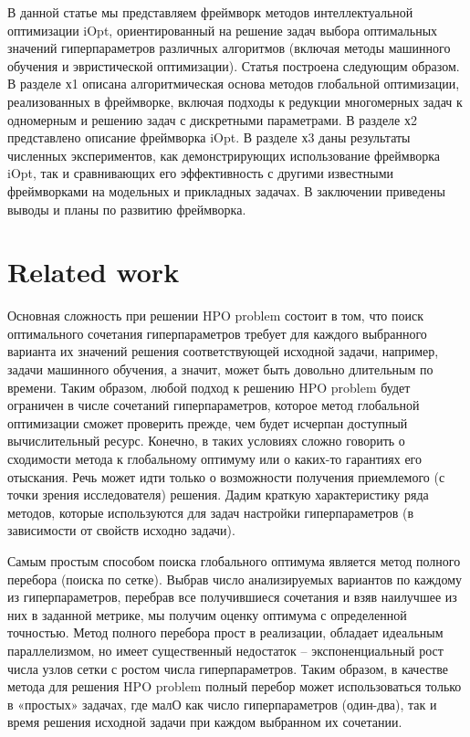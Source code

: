 \documentclass[preprint,12pt]{elsarticle}
\begin{document}
В данной статье мы представляем фреймворк методов интеллектуальной оптимизации iOpt, ориентированный на решение задач выбора оптимальных значений гиперпараметров различных алгоритмов (включая методы машинного обучения и эвристической оптимизации). Статья построена следующим образом. В разделе х1 описана алгоритмическая основа методов глобальной оптимизации, реализованных в фреймворке, включая подходы к редукции многомерных задач к одномерным и решению задач с дискретными параметрами. В разделе х2 представлено описание фреймворка iOpt. В разделе х3 даны результаты численных экспериментов, как демонстрирующих использование фреймворка iOpt, так и сравнивающих его эффективность с другими известными фреймворками на модельных и прикладных задачах. В заключении приведены выводы и планы по развитию фреймворка.


\section{Related work}
\label{sec_rel}

Основная сложность при решении HPO problem состоит в том, что поиск оптимального сочетания гиперпараметров требует для каждого выбранного варианта их значений решения соответствующей исходной задачи, например, задачи машинного обучения, а значит, может быть довольно длительным по времени. Таким образом, любой подход к решению HPO problem будет ограничен в числе сочетаний гиперпараметров, которое метод глобальной оптимизации сможет проверить прежде, чем будет исчерпан доступный вычислительный ресурс. Конечно, в таких условиях сложно говорить о сходимости метода к глобальному оптимуму или о каких-то гарантиях его отыскания. Речь может идти только о возможности получения приемлемого (с точки зрения исследователя) решения. Дадим краткую характеристику ряда методов, которые используются для задач настройки гиперпараметров (в зависимости от свойств исходно задачи).

Самым простым способом поиска глобального оптимума является метод полного перебора (поиска по сетке). Выбрав число анализируемых вариантов по каждому из гиперпараметров, перебрав все получившиеся сочетания и взяв наилучшее из них в заданной метрике, мы получим оценку оптимума с определенной точностью. Метод полного перебора прост в реализации, обладает идеальным параллелизмом, но имеет существенный недостаток – экспоненциальный рост числа узлов сетки с ростом числа гиперпараметров. Таким образом, в качестве метода для решения HPO problem полный перебор может использоваться только в «простых» задачах, где малО как число гиперпараметров (один-два), так и время решения исходной задачи при каждом выбранном их сочетании.
\end{document}
